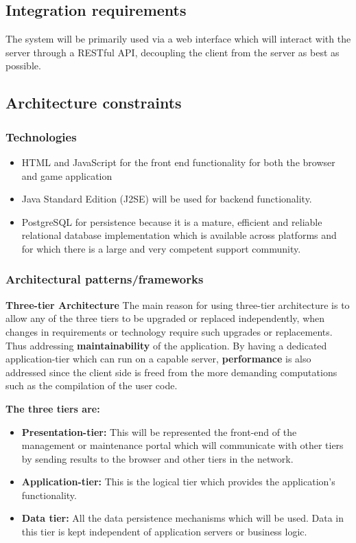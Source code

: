 \documentclass[english]{article}
\begin{document}
			
		\subsection{Integration requirements}
			\par The system will be primarily used via a web interface which will interact with the server through a RESTful API, decoupling the client from the server as best as possible.
			
		\setcounter{secnumdepth}{5}
		\subsection{Architecture constraints}
			\subsubsection{Technologies}
			\begin{itemize}
		  \item HTML and JavaScript for the front end functionality for both the browser and game application
		  \item Java Standard Edition (J2SE) will be used for backend functionality.
		  \item PostgreSQL for persistence because it is a mature, efficient and reliable relational database
          implementation which is available across platforms and for which there is a large and very competent
         support community.
       \end{itemize}
       
		\subsubsection{Architectural patterns/frameworks} %
		\textbf{Three-tier Architecture} %
		The main reason for using three-tier architecture is to allow any of the three tiers to be upgraded or replaced independently, when changes in requirements or technology require such upgrades or replacements. Thus addressing \textbf{maintainability} of the application. By having a dedicated application-tier which can run on a capable server, \textbf{performance} is also addressed since the client side is freed from the more demanding computations such as the compilation of the user code.
		
		\vspace{0.5cm}		
		
		\textbf{The three tiers are:}
			\begin{itemize}
			\item \textbf{Presentation-tier:} This will be represented the front-end of the management or maintenance portal which will communicate with other tiers by sending results to the browser and other tiers in the network.
			\item \textbf{Application-tier:} This is the logical tier which provides the application's functionality.	
			\item \textbf{Data tier:} All the data persistence mechanisms which will be used. Data in this tier is kept independent of application servers or business logic. 	
			\end{itemize}	
			
\end{document}
